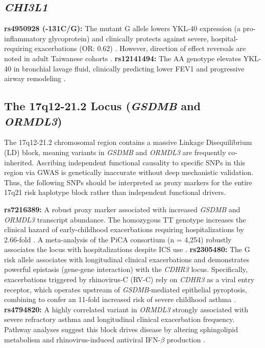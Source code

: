 \documentclass[11pt,a4paper]{article}
\begin{document}
\subsection{\textit{CHI3L1}}
\textbf{rs4950928 (-131C/G):} The mutant G allele lowers YKL-40 expression (a pro-inflammatory glycoprotein) and clinically protects against severe, hospital-requiring exacerbations (OR: 0.62) \cite{ParkTantisira2017, ZhuYan2017}. However, direction of effect reversals are noted in adult Taiwanese cohorts \cite{CHENWANG2021}.
\textbf{rs12141494:} The AA genotype elevates YKL-40 in bronchial lavage fluid, clinically predicting lower FEV1 and progressive airway remodeling \cite{AbeNakamura2018, ChenZhang2019, YuNiu2020}.

\subsection{The 17q12-21.2 Locus (\textit{GSDMB} and \textit{ORMDL3})}
The 17q12-21.2 chromosomal region contains a massive Linkage Disequilibrium (LD) block, meaning variants in \textit{GSDMB} and \textit{ORMDL3} are frequently co-inherited. Ascribing independent functional causality to specific SNPs in this region via GWAS is genetically inaccurate without deep mechanistic validation. Thus, the following SNPs should be interpreted as proxy markers for the entire 17q21 risk haplotype block rather than independent functional drivers.

\textbf{rs7216389:} A robust proxy marker associated with increased \textit{GSDMB} and \textit{ORMDL3} transcript abundance. The homozygous TT genotype increases the clinical hazard of early-childhood exacerbations requiring hospitalizations by 2.66-fold \cite{ParkTantisira2017, KhanBano2025}. A meta-analysis of the PiCA consortium (n = 4,254) robustly associates the locus with hospitalizations despite ICS use \cite{FarzanVijverberg2018, HernandezPachecoVijverberg2020}.
\textbf{rs2305480:} The G risk allele associates with longitudinal clinical exacerbations and demonstrates powerful epistasis (gene-gene interaction) with the \textit{CDHR3} locus. Specifically, exacerbations triggered by rhinovirus-C (RV-C) rely on \textit{CDHR3} as a viral entry receptor, which operates upstream of \textit{GSDMB}-mediated epithelial pyroptosis, combining to confer an 11-fold increased risk of severe childhood asthma \cite{LiChristenson2021, EliasenPedersen2022}.
\textbf{rs4794820:} A highly correlated variant in \textit{ORMDL3} strongly associated with severe refractory asthma and longitudinal clinical exacerbation frequency. Pathway analyses suggest this block drives disease by altering sphingolipid metabolism and rhinovirus-induced antiviral IFN-$\beta$ production \cite{WangTantisira2016, Almacioglu2023, NevilleChoi2018}.
\end{document}
